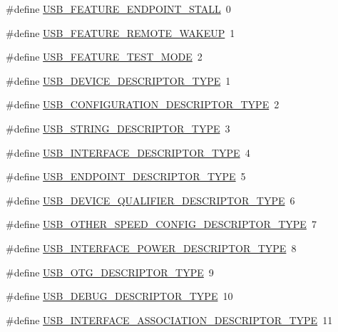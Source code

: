 \begin{DoxyCompactItemize}
\item 
\#define \hyperlink{group__USBD__Core_ga3ff0518fb298c9c9b556f59c0468ec0d}{U\+S\+B\+\_\+\+F\+E\+A\+T\+U\+R\+E\+\_\+\+E\+N\+D\+P\+O\+I\+N\+T\+\_\+\+S\+T\+A\+LL}~0
\item 
\#define \hyperlink{group__USBD__Core_ga2185a0541f4155470596c9c739c1656b}{U\+S\+B\+\_\+\+F\+E\+A\+T\+U\+R\+E\+\_\+\+R\+E\+M\+O\+T\+E\+\_\+\+W\+A\+K\+E\+UP}~1
\item 
\#define \hyperlink{group__USBD__Core_ga90a1a76a81c04849dc897dacf6c3a213}{U\+S\+B\+\_\+\+F\+E\+A\+T\+U\+R\+E\+\_\+\+T\+E\+S\+T\+\_\+\+M\+O\+DE}~2
\end{DoxyCompactItemize}
\begin{DoxyCompactItemize}
\item 
\#define \hyperlink{group__USBD__Core_ga722f2d6ee2892228b6708e8b9904c645}{U\+S\+B\+\_\+\+D\+E\+V\+I\+C\+E\+\_\+\+D\+E\+S\+C\+R\+I\+P\+T\+O\+R\+\_\+\+T\+Y\+PE}~1
\item 
\#define \hyperlink{group__USBD__Core_ga45e81401e4b530280fdd539da1b06c26}{U\+S\+B\+\_\+\+C\+O\+N\+F\+I\+G\+U\+R\+A\+T\+I\+O\+N\+\_\+\+D\+E\+S\+C\+R\+I\+P\+T\+O\+R\+\_\+\+T\+Y\+PE}~2
\item 
\#define \hyperlink{group__USBD__Core_gab01c9c74f2eb266b20aecd48bab4b35c}{U\+S\+B\+\_\+\+S\+T\+R\+I\+N\+G\+\_\+\+D\+E\+S\+C\+R\+I\+P\+T\+O\+R\+\_\+\+T\+Y\+PE}~3
\item 
\#define \hyperlink{group__USBD__Core_gad1699884fa580bba35246a566264c978}{U\+S\+B\+\_\+\+I\+N\+T\+E\+R\+F\+A\+C\+E\+\_\+\+D\+E\+S\+C\+R\+I\+P\+T\+O\+R\+\_\+\+T\+Y\+PE}~4
\item 
\#define \hyperlink{group__USBD__Core_ga4e8d6d81a224f8b511edc92b6cb4e085}{U\+S\+B\+\_\+\+E\+N\+D\+P\+O\+I\+N\+T\+\_\+\+D\+E\+S\+C\+R\+I\+P\+T\+O\+R\+\_\+\+T\+Y\+PE}~5
\item 
\#define \hyperlink{group__USBD__Core_ga7158946184590ea6cfcb406d7f3c4ce5}{U\+S\+B\+\_\+\+D\+E\+V\+I\+C\+E\+\_\+\+Q\+U\+A\+L\+I\+F\+I\+E\+R\+\_\+\+D\+E\+S\+C\+R\+I\+P\+T\+O\+R\+\_\+\+T\+Y\+PE}~6
\item 
\#define \hyperlink{group__USBD__Core_ga0d886bcc28cf10d730106d7be9b661fd}{U\+S\+B\+\_\+\+O\+T\+H\+E\+R\+\_\+\+S\+P\+E\+E\+D\+\_\+\+C\+O\+N\+F\+I\+G\+\_\+\+D\+E\+S\+C\+R\+I\+P\+T\+O\+R\+\_\+\+T\+Y\+PE}~7
\item 
\#define \hyperlink{group__USBD__Core_ga3356db66a2c62f7018f23f9189ba34c9}{U\+S\+B\+\_\+\+I\+N\+T\+E\+R\+F\+A\+C\+E\+\_\+\+P\+O\+W\+E\+R\+\_\+\+D\+E\+S\+C\+R\+I\+P\+T\+O\+R\+\_\+\+T\+Y\+PE}~8
\item 
\#define \hyperlink{group__USBD__Core_ga0e105187070c79d5843dde5503bb78f2}{U\+S\+B\+\_\+\+O\+T\+G\+\_\+\+D\+E\+S\+C\+R\+I\+P\+T\+O\+R\+\_\+\+T\+Y\+PE}~9
\item 
\#define \hyperlink{group__USBD__Core_ga9d5ac46d5f303464ac827d63f9da984e}{U\+S\+B\+\_\+\+D\+E\+B\+U\+G\+\_\+\+D\+E\+S\+C\+R\+I\+P\+T\+O\+R\+\_\+\+T\+Y\+PE}~10
\item 
\#define \hyperlink{group__USBD__Core_ga2ab1841a48da627b702526b01eb31268}{U\+S\+B\+\_\+\+I\+N\+T\+E\+R\+F\+A\+C\+E\+\_\+\+A\+S\+S\+O\+C\+I\+A\+T\+I\+O\+N\+\_\+\+D\+E\+S\+C\+R\+I\+P\+T\+O\+R\+\_\+\+T\+Y\+PE}~11
\end{DoxyCompactItemize}
